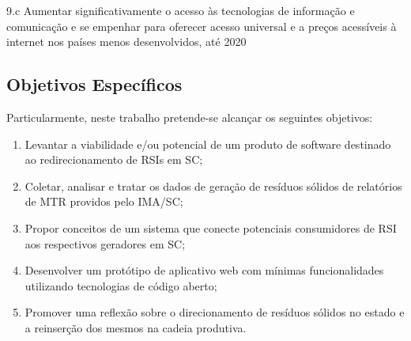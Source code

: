 \begin{citacao}
	9.c Aumentar significativamente o acesso às tecnologias de informação e comunicação e se empenhar para oferecer acesso universal e a preços acessíveis à internet nos países menos desenvolvidos, até 2020
\end{citacao}

\subsection{Objetivos Específicos}

Particularmente, neste trabalho pretende-se alcançar os seguintes objetivos:
\begin{enumerate}
    \item Levantar a viabilidade e/ou potencial de um produto de software destinado ao redirecionamento de \gls{RSI}s em \gls{SC};
	\item Coletar, analisar e tratar os dados de geração de resíduos sólidos de relatórios de \gls{MTR} providos pelo \gls{IMA/SC};
	\item Propor conceitos de um sistema que conecte potenciais consumidores de \gls{RSI} aos respectivos geradores em \gls{SC};
	\item Desenvolver um protótipo de aplicativo web com mínimas funcionalidades utilizando tecnologias de código aberto;
	\item Promover uma reflexão sobre o direcionamento de resíduos sólidos no estado e a reinserção dos mesmos na cadeia produtiva.
\end{enumerate}